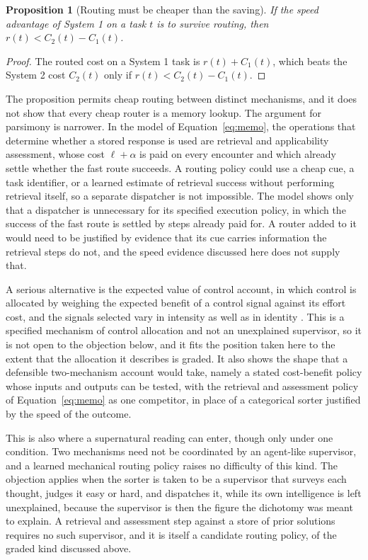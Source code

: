 \documentclass[11pt]{report}
\newtheorem{proposition}{Proposition}[chapter]
\theoremstyle{remark}
\theoremstyle{definition}
\begin{document}
\begin{proposition}[Routing must be cheaper than the saving]
If the speed advantage of System 1 on a task $t$ is to survive routing, then $r(t)<C_{2}(t)-C_{1}(t)$.
\end{proposition}

\begin{proof}
The routed cost on a System 1 task is $r(t)+C_1(t)$, which beats the System 2 cost $C_2(t)$ only if $r(t)<C_2(t)-C_1(t)$.
\end{proof}

The proposition permits cheap routing between distinct mechanisms, and it does not show that every cheap router is a memory lookup. The argument for parsimony is narrower. In the model of Equation~\eqref{eq:memo}, the operations that determine whether a stored response is used are retrieval and applicability assessment, whose cost $\ell+\alpha$ is paid on every encounter and which already settle whether the fast route succeeds. A routing policy could use a cheap cue, a task identifier, or a learned estimate of retrieval success without performing retrieval itself, so a separate dispatcher is not impossible. The model shows only that a dispatcher is unnecessary for its specified execution policy, in which the success of the fast route is settled by steps already paid for. A router added to it would need to be justified by evidence that its cue carries information the retrieval steps do not, and the speed evidence discussed here does not supply that.

A serious alternative is the expected value of control account, in which control is allocated by weighing the expected benefit of a control signal against its effort cost, and the signals selected vary in intensity as well as in identity \cite{shenhav2013}. This is a specified mechanism of control allocation and not an unexplained supervisor, so it is not open to the objection below, and it fits the position taken here to the extent that the allocation it describes is graded. It also shows the shape that a defensible two-mechanism account would take, namely a stated cost-benefit policy whose inputs and outputs can be tested, with the retrieval and assessment policy of Equation~\eqref{eq:memo} as one competitor, in place of a categorical sorter justified by the speed of the outcome.

This is also where a supernatural reading can enter, though only under one condition. Two mechanisms need not be coordinated by an agent-like supervisor, and a learned mechanical routing policy raises no difficulty of this kind. The objection applies when the sorter is taken to be a supervisor that surveys each thought, judges it easy or hard, and dispatches it, while its own intelligence is left unexplained, because the supervisor is then the figure the dichotomy was meant to explain. A retrieval and assessment step against a store of prior solutions requires no such supervisor, and it is itself a candidate routing policy, of the graded kind discussed above.
\end{document}

